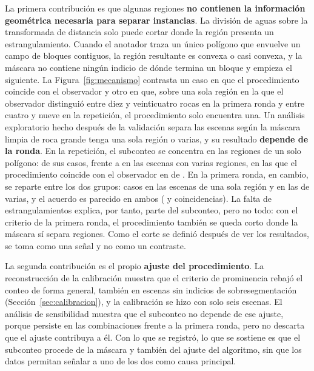 La primera contribución es que algunas regiones \textbf{no contienen la información geométrica
necesaria para separar instancias}. La división de aguas sobre la transformada de distancia solo
puede cortar donde la región presenta un estrangulamiento. Cuando el anotador traza un único
polígono que envuelve un campo de bloques contiguos, la región resultante es convexa o casi
convexa, y la máscara no contiene ningún indicio de dónde termina un bloque y empieza el
siguiente. La Figura~\ref{fig:mecanismo} contrasta un caso en que el procedimiento coincide con
el observador y otro en que, sobre una sola región en la que el observador distinguió entre diez y
veinticuatro rocas en la primera ronda y entre cuatro y nueve en la repetición, el procedimiento
solo encuentra una. Un análisis exploratorio hecho después de la validación separa las escenas
según la máscara limpia de roca grande tenga una sola región o varias, y su resultado
\textbf{depende de la ronda}. En la repetición, el subconteo se concentra en las regiones de un
solo polígono: \cVSegRegUnaAbajo{} de sus \cVSegAbajo{} casos, frente a \cVSegRegVariasAbajo{} en
las escenas con varias regiones, en las que el procedimiento coincide con el observador en
\cVSegRegVariasCoinc{} de \cVSegRegVariasN. En la primera ronda, en cambio, se reparte entre los
dos grupos: \cVRegUnaAbajo{} casos en las \cVRegUnaN{} escenas de una sola región y
\cVRegVariasAbajo{} en las \cVRegVariasN{} de varias, y el acuerdo es parecido en ambos
(\cVRegUnaCoinc{} y \cVRegVariasCoinc{} coincidencias). La falta de estrangulamientos explica,
por tanto, parte del subconteo, pero no todo: con el criterio de la primera ronda, el
procedimiento también se queda corto donde la máscara sí separa regiones. Como el corte se
definió después de ver los resultados, se toma como una señal y no como un contraste.

La segunda contribución es el propio \textbf{ajuste del procedimiento}. La reconstrucción de la
calibración muestra que el criterio de prominencia rebajó el conteo de forma general, también en
escenas sin indicios de sobresegmentación (Sección~\ref{sec:calibracion}), y la calibración se
hizo con solo seis escenas. El análisis de sensibilidad muestra que el subconteo no depende de
ese ajuste, porque persiste en las \cSenMasAbajo{} combinaciones frente a la primera ronda, pero
no descarta que el ajuste contribuya a él. Con lo que se registró, lo que se sostiene es que el
subconteo procede de la máscara y también del ajuste del algoritmo, sin que los datos permitan
señalar a uno de los dos como causa principal.

